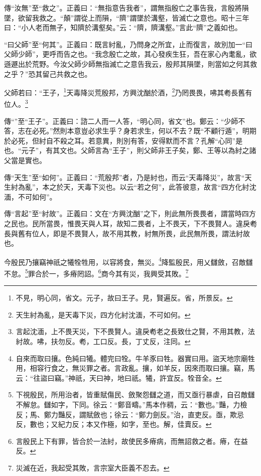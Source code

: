 {\noindent\zhuan{}\fzbyks 傳“汝無”至“救之”。正義曰：“無指意告我者”，謂無指殷亡之事告我，言殷將隕墜，欲留我救之。“顛”謂從上而隕，“隮”謂墜於溝壑，皆滅亡之意也。昭十三年曰：“小人老而無子，知隮於溝壑矣。”云：“隮，隮溝壑。”言此“隮”之義如也。 \par}

{\noindent\shu{}\fzkt “曰父師”至“何其”。正義曰：既言紂亂，乃問身之所宜，止而復言，故別加一“曰父師少師”，更呼而告之也。“我念殷亡之故，其心發疾生狂，吾在家心內耄亂，欲遜遯出於荒野。今汝父師少師無指滅亡之意告我云，殷邦其隕墜，則當如之何其救之乎？”恐其留己共救之也。 \par}

父師若曰：“王子，\footnote{不見，明心同，省文。元子，故曰王子。見，賢遍反。省，所景反。}天毒降災荒殷邦，方興沈酗於酒，\footnote{天生紂為亂，是天毒下災，四方化紂沈湎，不可如何。}乃罔畏畏，咈其耇長舊有位人。\footnote{言起沈湎，上不畏天災，下不畏賢人。違戾耇老之長致仕之賢，不用其教，法紂故。咈，扶勿反。耇，工口反。長，丁丈反，注同。}


{\noindent\zhuan{}\fzbyks 傳“”至“王子”。正義曰：諮二人而一人答，“明心同，省文”也。鄭云：“少師不答，志在必死。”然則本意豈必求生乎？身若求生，何以不去？既“不顧行遁”，明期於必死，但紂自不殺之耳。若意異，則別有答，安得默而不言？孔解“心同”是也。“元子”，有其文也。父師言為“王子”，則父師非王子矣，鄭、王等以為紂之諸父當是實也。 \par}

{\noindent\zhuan{}\fzbyks 傳“天生”至“如何”。正義曰：“荒殷邦”者，乃是紂也，而云“天毒降災”，故言“天生紂為亂”，本之於天，天毒下災也。以云“若之何”，此答彼意，故言“四方化紂沈湎，不可如何”。 \par}

{\noindent\zhuan{}\fzbyks 傳“言起”至“紂故”。正義曰：文在“方興沈酗”之下，則此無所畏畏者，謂當時四方之民也。民所當畏，惟畏天與人耳，故知二畏者，上不畏天，下不畏賢人。違戾耇長與舊有位人，即是不畏賢人，故不用其教，紂無所畏，此民無所畏，謂法紂故也。 \par}

今殷民乃攘竊神祇之犧牷牲用，以容將食，無災。\footnote{自來而取曰攘。色純曰犧。體完曰牷。牛羊豕曰牲。器實曰用。盜天地宗廟牲用，相容行食之，無災罪之者。言政亂。攘，如羊反，因來而取曰攘。竊，馬云：“往盜曰竊。”神祇，天曰神，地曰祇。犧，許宜反。牷音全。}降監殷民，用乂讎斂，召敵讎不怠。\footnote{下視殷民，所用治者，皆重賦傷民、斂聚怨讎之道，而又亟行暴虐，自召敵讎不解怠。讎如字，下同。徐云：“鄭音疇。”馬本作稠，云：“數也。”豔，力檢反；馬、鄭力豔反，謂賦斂也；徐云：“鄭力劍反。”治，直吏反。亟，欺忌反，數也；又紀力反；本又作極，如字，至也。解，佳賣反。}罪合於一，多瘠罔詔。\footnote{言殷民上下有罪，皆合於一法紂，故使民多瘠病，而無詔救之者。瘠，在益反。}商今其有災，我興受其敗。\footnote{災滅在近，我起受其敗，言宗室大臣義不忍去。}


